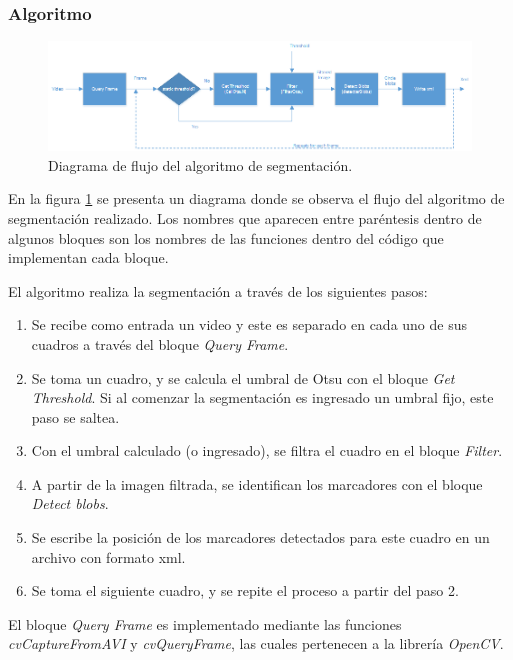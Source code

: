 \subsubsection{Algoritmo}

\begin{figure}[H]
\begin{center}
\includegraphics[scale=0.7]{img/diagrama_segmentacion.png}
\end{center}
\caption{Diagrama de flujo del algoritmo de segmentación.}
\label{diagramaSegmentacion}
\end{figure}

En la figura \ref{diagramaSegmentacion} se presenta un diagrama donde se observa el flujo del algoritmo de segmentación realizado. Los nombres que aparecen entre paréntesis dentro de algunos bloques son los nombres de las funciones dentro del código que implementan cada bloque. 

El algoritmo realiza la segmentación a través de los siguientes pasos:

\begin{enumerate}
  \item Se recibe como entrada un video y este es separado en cada uno de sus cuadros a través del bloque \emph{Query Frame}.
  \item Se toma un cuadro, y se calcula el umbral de Otsu con el bloque \emph{Get Threshold}. Si al comenzar la segmentación es ingresado un umbral fijo, este paso se saltea.
  \item Con el umbral calculado (o ingresado), se filtra el cuadro en el bloque \emph{Filter}.
  \item A partir de la imagen filtrada, se identifican los marcadores con el bloque \emph{Detect blobs}.
  \item Se escribe la posición de los marcadores detectados para este cuadro en un archivo con formato xml.
  \item Se toma el siguiente cuadro, y se repite el proceso a partir del paso 2.
\end{enumerate}


El bloque \emph{Query Frame} es implementado mediante las funciones \emph{cvCaptureFromAVI} y \emph{cvQueryFrame}, las cuales pertenecen a la librería \emph{OpenCV}\cite{opencv}.


